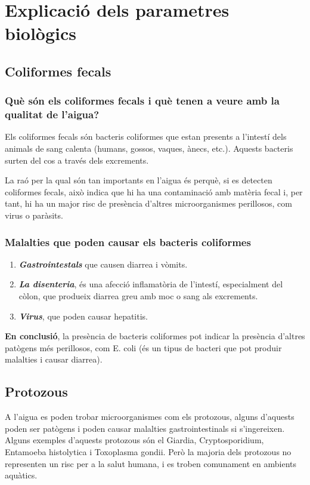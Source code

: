 \section{Explicació dels parametres biològics}
\subsection{Coliformes fecals} \label{subsec:coliformes}
\subsubsection{Què són els coliformes fecals i què tenen a veure amb la qualitat de l’aigua?}
Els coliformes fecals són bacteris coliformes que estan presents a l’intestí dels animals de sang calenta (humans, gossos, vaques, ànecs, etc.). Aquests bacteris surten del cos a través dels excrements.

La raó per la qual són tan importants en l’aigua és perquè, si es detecten coliformes fecals, això indica que hi ha una contaminació amb matèria fecal i, per tant, hi ha un major risc de presència d’altres microorganismes perillosos, com virus o paràsits.
\subsubsection{Malalties que poden causar els bacteris coliformes}
\begin{enumerate}
 \item \textit{\textbf{Gastrointestals}} que causen diarrea i vòmits.
 \item \textit{\textbf{La disenteria}}, és una afecció inflamatòria de l’intestí, especialment del còlon, que produeix diarrea greu amb moc o sang als excrements.
 \item \textit{\textbf{Virus}}, que poden causar hepatitis.
\end{enumerate}
\textbf{En conclusió}, la presència de bacteris coliformes pot indicar la presència d'altres patògens més perillosos, com E. coli (és un tipus de bacteri que pot produir malalties i causar diarrea).
\subsection{Protozous} \label{subsec:protozous}
A l’aigua es poden trobar microorganismes com els protozous, alguns d’aquests poden ser patògens i poden causar malalties gastrointestinals si s’ingereixen. Alguns exemples d’aquests protozous són el Giardia, Cryptosporidium, Entamoeba histolytica i Toxoplasma gondii. Però la majoria dels protozous no representen un risc per a la salut humana, i es troben comunament en ambients aquàtics.
